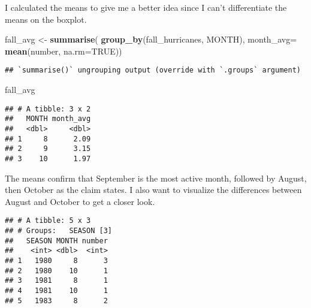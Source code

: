 \documentclass[
]{article}
\newenvironment{Shaded}{\begin{snugshade}}{\end{snugshade}}
\newcommand{\DataTypeTok}[1]{\textcolor[rgb]{0.13,0.29,0.53}{#1}}
\newcommand{\DecValTok}[1]{\textcolor[rgb]{0.00,0.00,0.81}{#1}}
\newcommand{\KeywordTok}[1]{\textcolor[rgb]{0.13,0.29,0.53}{\textbf{#1}}}
\newcommand{\NormalTok}[1]{#1}
\newcommand{\OperatorTok}[1]{\textcolor[rgb]{0.81,0.36,0.00}{\textbf{#1}}}
\newcommand{\OtherTok}[1]{\textcolor[rgb]{0.56,0.35,0.01}{#1}}
\newcommand{\StringTok}[1]{\textcolor[rgb]{0.31,0.60,0.02}{#1}}
\begin{document}
I calculated the means to give me a better idea since I can't
differentiate the means on the boxplot.

\begin{Shaded}
\begin{Highlighting}[]
\NormalTok{fall_avg <-}\StringTok{ }\KeywordTok{summarise}\NormalTok{(}
  \KeywordTok{group_by}\NormalTok{(fall_hurricanes, MONTH),}
  \DataTypeTok{month_avg=} \KeywordTok{mean}\NormalTok{(number, }\DataTypeTok{na.rm=}\OtherTok{TRUE}\NormalTok{))}
\end{Highlighting}
\end{Shaded}

\begin{verbatim}
## `summarise()` ungrouping output (override with `.groups` argument)
\end{verbatim}

\begin{Shaded}
\begin{Highlighting}[]
\NormalTok{fall_avg}
\end{Highlighting}
\end{Shaded}

\begin{verbatim}
## # A tibble: 3 x 2
##   MONTH month_avg
##   <dbl>     <dbl>
## 1     8      2.09
## 2     9      3.15
## 3    10      1.97
\end{verbatim}

The means confirm that September is the most active month, followed by
August, then October as the claim states. I also want to visualize the
differences between August and October to get a closer look.

\begin{Shaded}
\end{Shaded}

\begin{verbatim}
## # A tibble: 5 x 3
## # Groups:   SEASON [3]
##   SEASON MONTH number
##    <int> <dbl>  <int>
## 1   1980     8      3
## 2   1980    10      1
## 3   1981     8      1
## 4   1981    10      1
## 5   1983     8      2
\end{verbatim}
\end{document}
